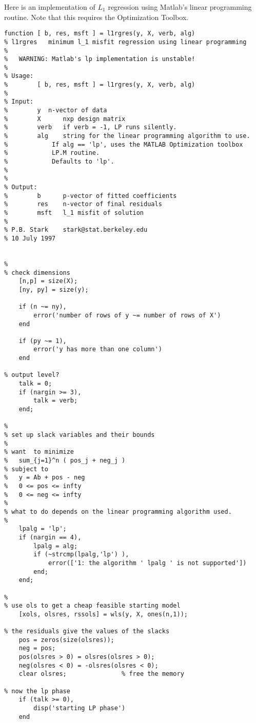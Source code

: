 Here is an implementation of $L_1$ regression using Matlab's linear programming
routine.
Note that this requires the Optimization Toolbox.

\begin{verbatim}
function [ b, res, msft ] = l1rgres(y, X, verb, alg)
% l1rgres   minimum l_1 misfit regression using linear programming
%
%   WARNING: Matlab's lp implementation is unstable!
%
% Usage:
%        [ b, res, msft ] = l1rgres(y, X, verb, alg)
%
% Input:
%        y  n-vector of data
%        X      nxp design matrix
%        verb   if verb = -1, LP runs silently.
%        alg    string for the linear programming algorithm to use.
%            If alg == 'lp', uses the MATLAB Optimization toolbox
%            LP.M routine.
%            Defaults to 'lp'.
%
%
% Output:
%        b      p-vector of fitted coefficients
%        res    n-vector of final residuals
%        msft   l_1 misfit of solution
%
% P.B. Stark    stark@stat.berkeley.edu
% 10 July 1997


%
% check dimensions
    [n,p] = size(X);
    [ny, py] = size(y);

    if (n ~= ny),
        error('number of rows of y ~= number of rows of X')
    end

    if (py ~= 1),
        error('y has more than one column')
    end

% output level?
    talk = 0;
    if (nargin >= 3),
        talk = verb;
    end;

%
% set up slack variables and their bounds
%
% want  to minimize
%   sum_{j=1}^n ( pos_j + neg_j )
% subject to
%   y = Ab + pos - neg
%   0 <= pos <= infty
%   0 <= neg <= infty
%
% what to do depends on the linear programming algorithm used.
%
    lpalg = 'lp';
    if (nargin == 4),
        lpalg = alg;
        if (~strcmp(lpalg,'lp') ),
            error(['1: the algorithm ' lpalg ' is not supported'])
        end;
    end;

%
% use ols to get a cheap feasible starting model
    [xols, olsres, rssols] = wls(y, X, ones(n,1));

% the residuals give the values of the slacks
    pos = zeros(size(olsres));
    neg = pos;
    pos(olsres > 0) = olsres(olsres > 0);
    neg(olsres < 0) = -olsres(olsres < 0);
    clear olsres;               % free the memory

% now the lp phase
    if (talk >= 0),
        disp('starting LP phase')
    end


\end{verbatim}
